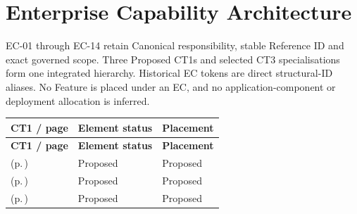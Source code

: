 \part{Enterprise Capability Architecture}\label{model:ec}
EC-01 through EC-14 retain Canonical responsibility, stable Reference ID and exact governed scope. Three Proposed CT1s and selected CT3 specialisations form one integrated hierarchy. Historical EC tokens are direct structural-ID aliases. No Feature is placed under an EC, and no application-component or deployment allocation is inferred.

\begingroup\small\setlength{\TableWidth}{\dimexpr\linewidth-6\tabcolsep-4\arrayrulewidth\relax}
\begin{longtable}{|>{\raggedright\arraybackslash}p{0.64\TableWidth}|>{\raggedright\arraybackslash}p{0.18\TableWidth}|>{\raggedright\arraybackslash}p{0.18\TableWidth}|}
\hline\rowcolor{TableHead}\textbf{CT1 / page} & \textbf{Element status} & \textbf{Placement}\\\hline\endfirsthead
\hline\rowcolor{TableHead}\textbf{CT1 / page} & \textbf{Element status} & \textbf{Placement}\\\hline\endhead
\hline\endfoot
\nameref{cap:ec-governed-information-operations} (p.\,\pageref{cap:ec-governed-information-operations}) & Proposed & Proposed\\\hline
\nameref{cap:ec-coordinated-activity-interaction} (p.\,\pageref{cap:ec-coordinated-activity-interaction}) & Proposed & Proposed\\\hline
\nameref{cap:ec-trust-accountability-assurance} (p.\,\pageref{cap:ec-trust-accountability-assurance}) & Proposed & Proposed\\\hline
\end{longtable}\endgroup
